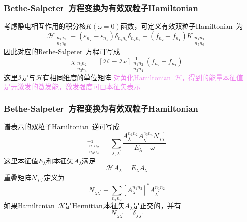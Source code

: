 \documentclass[cjk,slidestop,compress,mathserif,blue]{beamer}
\begin{document}
\frame
{
	\frametitle{\textrm{Bethe-Salpeter~}方程变换为有效双粒子\textrm{Hamiltonian}}
	考虑静电相互作用的积分核$K(\omega=0)$函数，可定义有效双粒子\textrm{Hamiltonian~}为
	\begin{displaymath}
		\mathcal{H}_{
			\substack{
				n_1 n_2\\
				n_5 n_6
			} }\equiv(\varepsilon_{n_2}-\varepsilon_{n_1})\delta_{n_1n_5}\delta_{n_2n_6}-(f_{n_2}-f_{n_1})K_{
			\substack{
				n_1 n_2\\
				n_5 n_6
			} }
	\end{displaymath}
	因此对应的\textrm{Bethe-Salpeter~}方程可写成
	\begin{displaymath}
		\chi_{ \substack{
			n_1 n_2\\n_3 n_4 
		} }=[\mathcal{H}-\mathcal{I}\omega]_{
			\substack{
				n_1 n_2\\
				n_3 n_4
			} }^{-1}(f_{n_2}-f_{n_1})
		\end{displaymath}
		这里$\mathcal{I}$是与$\mathcal{H}$有相同维度的单位矩阵
\vskip 5pt
\textcolor{violet}{对角化\textrm{Hamiltonian~}$\mathcal{H}$，得到的能量本征值是元激发的激发能，激发强度可由本征矢表示}
}

\frame
{
	\frametitle{\textrm{Bethe-Salpeter~}方程变换为有效双粒子\textrm{Hamiltonian}}
	谱表示的双粒子\textrm{Hamiltonian~}逆可写成
	\begin{displaymath}
		[\mathcal{H}-\mathcal{I}\omega]_{
			\substack{
				n_1 n_2\\
				n_3 n_4
			} }^{-1}=\sum_{\lambda,\lambda^{\prime}}\frac{A_{\lambda}^{n_1n_2}A_{\lambda^{\prime}}^{n_3n_4}N_{\lambda\lambda^{\prime}}^{-1}}{E_{\lambda}-\omega}
	\end{displaymath}
	这里本征值$E_{\lambda}$和本征矢$A_{\lambda}$满足
	\begin{displaymath}
		\mathcal{H}A_{\lambda}=E_{\lambda}A_{\lambda}
	\end{displaymath}
	重叠矩阵$N_{\lambda\lambda^{\prime}}$定义为
	\begin{displaymath}
		N_{\lambda\lambda^{\prime}}\equiv\sum_{n_1n_2}[A_{\lambda}^{n_1n_2}]^{\ast}A_{\lambda^{\prime}}^{n_1n_2}
	\end{displaymath}
	如果\textrm{Hamiltonian~}$\mathcal{H}$是\textrm{Hermitian},本征矢$A_{\lambda}$是正交的，并有
	\begin{displaymath}
		N_{\lambda\lambda^{\prime}}=\delta_{\lambda\lambda^{\prime}}
	\end{displaymath}
}
\end{document}
